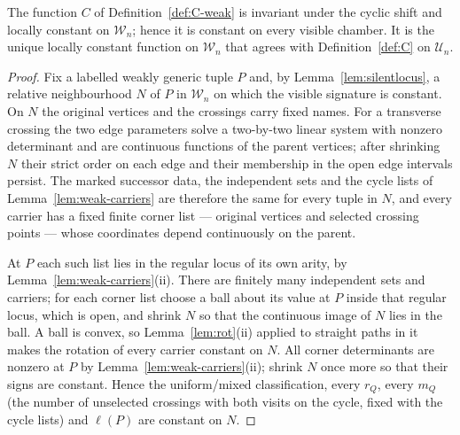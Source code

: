 \begin{lemma}\label{lem:C-weak-local}
The function $C$ of Definition~\ref{def:C-weak} is invariant under the
cyclic shift and locally constant on $\mathcal W_n$; hence it is constant
on every visible chamber. It is the unique locally constant function on
$\mathcal W_n$ that agrees with Definition~\ref{def:C} on $\mathcal U_n$.
\end{lemma}
\begin{proof}
Fix a labelled weakly generic tuple $P$ and, by Lemma~\ref{lem:silentlocus},
a relative neighbourhood $N$ of $P$ in $\mathcal W_n$ on which the visible
signature is constant. On $N$ the original vertices and the crossings carry
fixed names. For a transverse crossing the two edge parameters solve a
two-by-two linear system with nonzero determinant and are continuous
functions of the parent vertices; after shrinking $N$ their strict order on
each edge and their membership in the open edge intervals persist. The
marked successor data, the independent sets and the cycle lists of
Lemma~\ref{lem:weak-carriers} are therefore the same for every tuple in
$N$, and every carrier has a fixed finite corner list --- original vertices
and selected crossing points --- whose coordinates depend continuously on
the parent.

At $P$ each such list lies in the regular locus of its own arity, by
Lemma~\ref{lem:weak-carriers}(ii). There are finitely many independent sets
and carriers; for each corner list choose a ball about its value at $P$
inside that regular locus, which is open, and shrink $N$ so that the
continuous image of $N$ lies in the ball. A ball is convex, so
Lemma~\ref{lem:rot}(ii) applied to straight paths in it makes the rotation
of every carrier constant on $N$. All corner determinants are nonzero at
$P$ by Lemma~\ref{lem:weak-carriers}(ii); shrink $N$ once more so that
their signs are constant. Hence the uniform/mixed classification, every
$r_Q$, every $m_Q$ (the number of unselected crossings with both visits on
the cycle, fixed with the cycle lists) and $\ell(P)$ are constant on $N$.


\end{proof}
